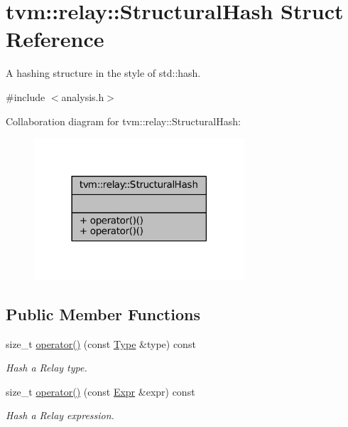\hypertarget{structtvm_1_1relay_1_1StructuralHash}{}\section{tvm\+:\+:relay\+:\+:Structural\+Hash Struct Reference}
\label{structtvm_1_1relay_1_1StructuralHash}


A hashing structure in the style of std\+::hash.  




{\ttfamily \#include $<$analysis.\+h$>$}



Collaboration diagram for tvm\+:\+:relay\+:\+:Structural\+Hash\+:
\nopagebreak
\begin{figure}[H]
\begin{center}
\leavevmode
\includegraphics[width=222pt]{structtvm_1_1relay_1_1StructuralHash__coll__graph}
\end{center}
\end{figure}
\subsection*{Public Member Functions}
\begin{DoxyCompactItemize}
\item 
size\+\_\+t \hyperlink{structtvm_1_1relay_1_1StructuralHash_a9a5df8e3b2ebcd69388f18beaba2d3f5}{operator()} (const \hyperlink{namespacetvm_1_1relay_a661d95f170bca230773914caeef3fe52}{Type} \&type) const 
\begin{DoxyCompactList}\small\item\em Hash a Relay type. \end{DoxyCompactList}\item 
size\+\_\+t \hyperlink{structtvm_1_1relay_1_1StructuralHash_a1789787a993785ce3f3b1bde05bea4ee}{operator()} (const \hyperlink{namespacetvm_1_1relay_a5b84e3790f89bb3fad5c7911eeb99531}{Expr} \&expr) const 
\begin{DoxyCompactList}\small\item\em Hash a Relay expression. \end{DoxyCompactList}\end{DoxyCompactItemize}


